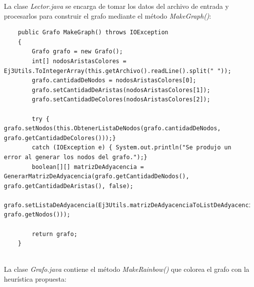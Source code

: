 La clase \emph{Lector.java} se encarga de tomar los datos del archivo de entrada y procesarlos para construir el grafo mediante el método \textit{MakeGraph()}:\\

\begin{lstlisting}
	public Grafo MakeGraph() throws IOException 
	{
		Grafo grafo = new Grafo();
		int[] nodosAristasColores = Ej3Utils.ToIntegerArray(this.getArchivo().readLine().split(" "));
		grafo.cantidadDeNodos = nodosAristasColores[0];
		grafo.setCantidadDeAristas(nodosAristasColores[1]);
		grafo.setCantidadDeColores(nodosAristasColores[2]);
		
		try { grafo.setNodos(this.ObtenerListaDeNodos(grafo.cantidadDeNodos, grafo.getCantidadDeColores()));} 
		catch (IOException e) { System.out.println("Se produjo un error al generar los nodos del grafo.");}
		boolean[][] matrizDeAdyacencia = GenerarMatrizDeAdyacencia(grafo.getCantidadDeNodos(), grafo.getCantidadDeAristas(), false);
		grafo.setListaDeAdyacencia(Ej3Utils.matrizDeAdyacenciaToListDeAdyacencia(matrizDeAdyacencia, grafo.getNodos()));
		
		return grafo;
	}
		
\end{lstlisting}


La clase \emph{Grafo.java} contiene el método \textit{MakeRainbow()} que colorea el grafo con la heurística \newline propuesta: \\

